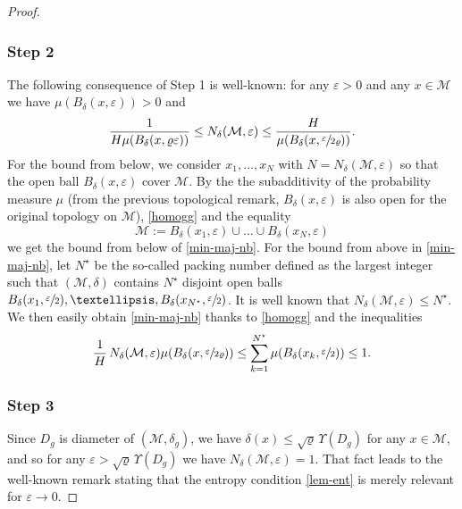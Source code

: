 \documentclass[11pt]{article}
\theoremstyle{theorem}
\theoremstyle{definition}
\newcommand\ep{\varepsilon}
\begin{document}
\begin{proof}
\subsubsection*{Step 2} The following consequence of Step 1 is well-known: for any $\ep>0$ and any $x\in\mathcal{M}$ we have $\mu(B_{\delta}(x,\ep))>0$ and
\begin{equation}\label{min-maj-nb}
\frac{1}{H\mu(B_\delta(x,\varrho\ep))} \leq N_\delta(\mathcal{M},\ep) \leq \frac{H}{\mu(B_\delta(x,\sfrac{\ep}{2\varrho}))}.
\end{equation}
For the bound from below, we consider $x_1,\dots,x_N$ with $N=N_\delta(\mathcal{M},\ep)$ so that the open ball $B_{\delta}(x,\ep)$ cover $\mathcal{M}$. By the the subadditivity of the probability measure $\mu$ (from the previous topological remark, $B_\delta(x,\ep)$ is also open for the original topology on $\mathcal{M}$), \eqref{homogg} and the equality
\begin{equation*}
\mathcal{M}:=B_{\delta}(x_1,\ep)\cup\dots \cup B_{\delta}(x_N,\ep)
\end{equation*}
we get the bound from below of \eqref{min-maj-nb}.
For the bound from above in \eqref{min-maj-nb}, let $N^\star$ be the so-called packing number defined as the largest integer such that $(\mathcal{M},\delta)$ contains $N^\star$ disjoint open balls $B_{\delta}(x_1,\sfrac{\ep}{2}),\dots,B_{\delta}(x_{N^\star},\sfrac{\ep}{2})$. It is well known that \hbox{$N_\delta(\mathcal{M},\ep)\leq N^\star$}. We then easily obtain \eqref{min-maj-nb} thanks to \eqref{homogg} and the inequalities
\begin{equation*}
\frac{1}{H}\, N_{\delta}(\mathcal{M},\ep) \mu(B_{\delta}(x,\sfrac{\ep}{2\varrho}))\leq \sum_{k=1}^{N^\star} \mu(B_{\delta}(x_k,\sfrac{\ep}{2})) \leq 1.
\end{equation*}

\subsubsection*{Step 3} Since $D_g$ is diameter of $(\mathcal{M},\delta_g)$, we have
$\delta(x)\leq \sqrt{\varrho}\,\Upsilon(D_g)$ for any $x\in \mathcal{M}$, and so for any $\ep>\sqrt{\varrho}\,\Upsilon(D_g)$ we have $N_\delta(\mathcal{M},\ep)=1$. That fact leads to the well-known remark stating that the entropy condition \eqref{lem-ent} is merely relevant for $\ep\to 0$.


\end{proof}
\end{document}
